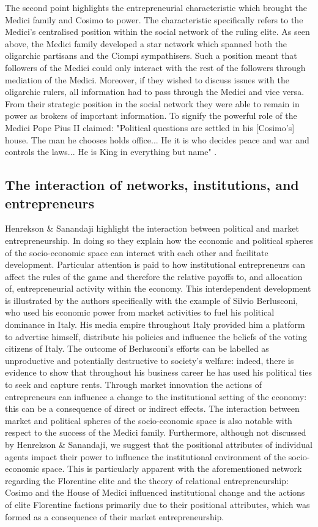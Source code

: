 The second point highlights the entrepreneurial characteristic which brought the Medici family and Cosimo to power. The characteristic specifically refers to the Medici's centralised position within the social network of the ruling elite. As seen above, the Medici family developed a star network which spanned both the oligarchic partisans and the Ciompi sympathisers. Such a position meant that followers of the Medici could only interact with the rest of the followers through mediation of the Medici. Moreover, if they wished to discuss issues with the oligarchic rulers, all information had to pass through the Medici and vice versa. From their strategic position in the social network they were able to remain in power as brokers of important information. To signify the powerful role of the Medici Pope Pius II claimed: "Political questions are settled in his [Cosimo's] house. The man he chooses holds office... He it is who decides peace and war and controls the laws... He is King in everything but name" \citep{Hibbert1980}.

\subsection{The interaction of networks, institutions, and entrepreneurs}

Henrekson \& Sanandaji highlight the interaction between political and market entrepreneurship. In doing so they explain how the economic and political spheres of the socio-economic space can interact with each other and facilitate development. Particular attention is paid to how institutional entrepreneurs can affect the rules of the game and therefore the relative payoffs to, and allocation of, entrepreneurial activity within the economy. This interdependent development is illustrated by the authors specifically with the example of Silvio Berlusconi, who used his economic power from market activities to fuel his political dominance in Italy. His media empire throughout Italy provided him a platform to advertise himself, distribute his policies and influence the beliefs of the voting citizens of Italy. The outcome of Berlusconi's efforts can be labelled as unproductive and potentially destructive to society's welfare: indeed, there is evidence to show that throughout his business career he has used his political ties to seek and capture rents. Through market innovation the actions of entrepreneurs can influence a change to the institutional setting of the economy: this can be a consequence of direct or indirect effects. The interaction between market and political spheres of the socio-economic space is also notable with respect to the success of the Medici family. Furthermore, although not discussed by Henrekson \& Sanandaji, we suggest that the positional attributes of individual agents impact their power to influence the institutional environment of the socio-economic space. This is particularly apparent with the aforementioned network regarding the Florentine elite and the theory of relational entrepreneurship: Cosimo and the House of Medici influenced institutional change and the actions of elite Florentine factions primarily due to their positional attributes, which was formed as a consequence of their market entrepreneurship.

